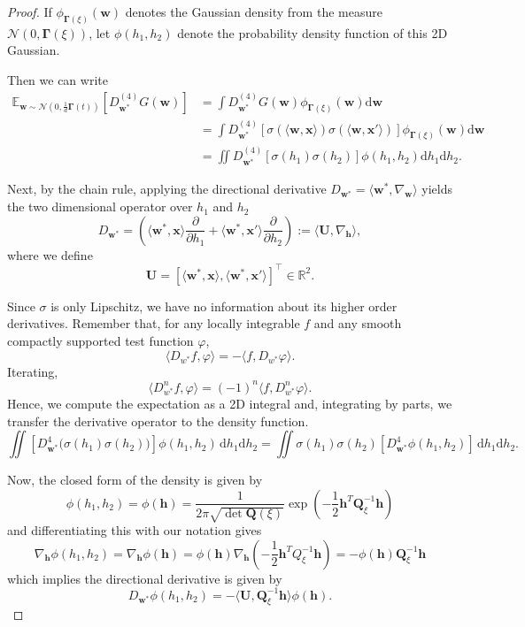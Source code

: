 \begin{proof}
    If $\phi_{\bm \Gamma(\xi)}(\bm w)$ denotes the Gaussian density from the measure $\mathcal N(0, \bm \Gamma(\xi))$, let $\phi(h_1, h_2)$ denote the probability density function of this 2D Gaussian.
    
    Then we can write
    \begin{align*}
        \mathbb E_{\bm w \sim \mathcal N(0, \frac{1}{d}\bm \Gamma(t))}[D_{\bm w^*}^{(4)} G(\bm w) ] &= \int D_{\bm w^*}^{(4)} G(\bm w)\phi_{\bm \Gamma(\xi)}(\bm w)\mathrm d \bm w \\
        &= \int D_{\bm w^*}^{(4)} [\sigma(\langle \bm w, \bm x\rangle)\sigma(\langle \bm w, \bm x'\rangle)] \phi_{\bm \Gamma(\xi)}(\bm w)\mathrm d \bm w \\
        &= \iint D_{\bm w^*}^{(4)} [\sigma(h_1)\sigma(h_2)] \phi(h_1, h_2) \mathrm d h_1 \mathrm dh_2.   
    \end{align*}
    
    Next, by the chain rule, applying the directional derivative $D_{\bm w^*} = \langle \bm w^* , \nabla_{\bm w}\rangle$ yields the two dimensional operator over $h_1$ and $h_2$
    \[
        D_{\bm w^*} = \left( \langle \bm w^*, \bm x\rangle  \frac{\partial}{\partial h_1} + \langle \bm w^*, \bm x'\rangle \frac{\partial}{\partial h_2} \right) := \langle \bm U, \nabla_{\bm h}\rangle,
    \]
    where we define
    \[
        \bm U = [\langle \bm w^*, \bm x\rangle, \langle \bm w^*, \bm x'\rangle]^{\top} \in \mathbb R^2.
    \]

    Since $\sigma$ is only Lipschitz, we have no information about its higher order derivatives. Remember that, for any locally integrable $f$ and any smooth compactly supported test function $\varphi$,
    \[
        \langle D_{w^*} f, \varphi \rangle = - \langle f, D_{w^*} \varphi \rangle .
    \]
    Iterating,
    \[
        \langle D_{w^*}^n f, \varphi \rangle = (-1)^n \langle f, D_{w^*}^n \varphi \rangle .
    \]
    Hence, we compute the expectation as a 2D integral and, integrating by parts, we transfer the derivative operator to the density function. 
    \[
        \iint \left[ D_{\bm w^*}^4 \Big( \sigma(h_1)\sigma(h_2) \Big) \right] \phi(h_1, h_2) \, \mathrm d h_1 \mathrm d h_2 =  \iint \sigma(h_1)\sigma(h_2) \left[ D_{\bm w^*}^4 \phi(h_1, h_2) \right] \, \mathrm d h_1 \mathrm d h_2.
    \]

    Now, the closed form of the density is given by
    \[
        \phi(h_1, h_2) = \phi(\bm h) = \frac{1}{2\pi\sqrt{ \det \bm Q(\xi)}} \exp\left( -\frac{1}{2} \bm h^T \bm Q_\xi^{-1} \bm h \right)
    \]
    and differentiating this with our notation gives
    \[
        \nabla_{\bm h}\phi(h_1, h_2) = \nabla_{\bm h}\phi(\bm h) = \phi(\bm h)\nabla_{\bm h}\left( -\frac{1}{2} \bm h^T Q_\xi^{-1} \bm h \right) = -\phi(\bm h) \bm Q_\xi^{-1}\bm h
    \]
    which implies the directional derivative is given by 
    \[
        D_{\bm w^*}\phi(h_1, h_2)  = -\langle \bm U, \bm Q_\xi^{-1}\bm h\rangle \phi(\bm h).
    \]


\end{proof}
